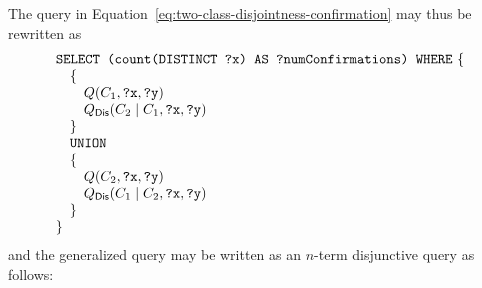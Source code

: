 \documentclass[a4paper]{article}
\newcounter{ex}
\begin{document}
The query in Equation~\ref{eq:two-class-disjointness-confirmation}
may thus be rewritten as
\begin{equation}
  \begin{minipage}[c]{5in}
    \begin{tabbing}
      \quad\=\quad\=\quad\=\kill
      \texttt{SELECT (count(DISTINCT ?x) AS ?numConfirmations) WHERE} \{\\
      \>\{\\
      \>\>$Q(C_1, \mbox{\tt ?x}, \mbox{\tt ?y})$\\
      \>\>$Q_{\mathsf{Dis}}(C_2 \mid C_1, \mbox{\tt ?x}, \mbox{\tt ?y})$\\
      \>\}\\
      \>\texttt{UNION}\\
      \>\{\\
      \>\>$Q(C_2, \mbox{\tt ?x}, \mbox{\tt ?y})$\\
      \>\>$Q_{\mathsf{Dis}}(C_1 \mid C_2, \mbox{\tt ?x}, \mbox{\tt ?y})$\\
      \>\}\\
      \}
    \end{tabbing}
  \end{minipage}
\end{equation}
and the generalized query may be written as an $n$-term disjunctive query as follows:
\end{document}
